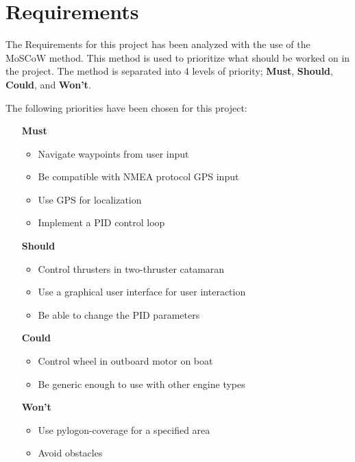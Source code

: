 \chapter{Requirements}

The Requirements for this project has been analyzed with the use of the MoSCoW method. This method is used to prioritize what should be worked on in the project. The method is separated into 4 levels of priority; \textbf{Must}, \textbf{Should}, \textbf{Could}, and \textbf{Won't}.

\noindent The following priorities have been chosen for this project:
\begin{itemize}
	\item[\textbf{Must}]
		\begin{itemize}
			\item Navigate waypoints from user input
			\item Be compatible with NMEA protocol GPS input
			\item Use GPS for localization
			\item Implement a PID control loop
		\end{itemize}
	\item[\textbf{Should}]
		\begin{itemize}
			\item Control thrusters in two-thruster catamaran
			\item Use a graphical user interface for user interaction
			\item Be able to change the PID parameters
		\end{itemize}
	\item[\textbf{Could}] 
		\begin{itemize}
			\item Control wheel in outboard motor on boat
			\item Be generic enough to use with other engine types
		\end{itemize}
	\item[\textbf{Won't}]
		\begin{itemize}
			\item Use pylogon-coverage for a specified area
			\item Avoid obstacles
		\end{itemize}
\end{itemize}


